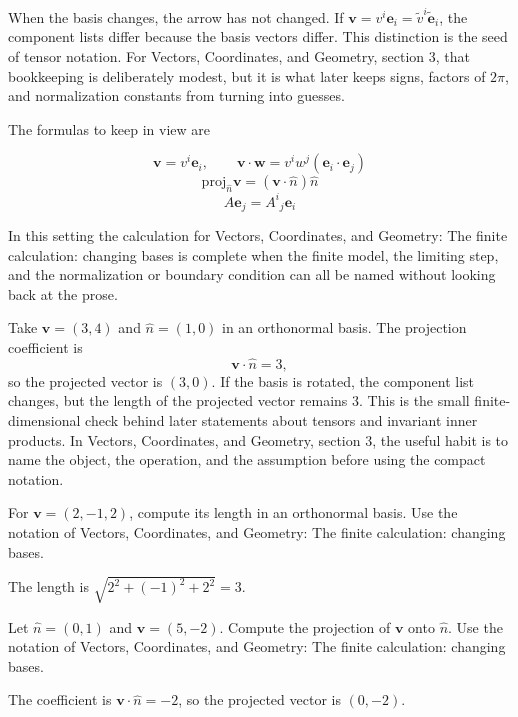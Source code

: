When the basis changes, the arrow has not changed.  If \(\bm v=v^i\bm e_i=\tilde v^i\tilde{\bm e}_i\), the component lists differ because the basis vectors differ.  This distinction is the seed of tensor notation.  For Vectors, Coordinates, and Geometry, section 3, that bookkeeping is deliberately modest, but it is what later keeps signs, factors of \(2\pi\), and normalization constants from turning into guesses.

The formulas to keep in view are

\[
  \bm v=v^i\bm e_i,\qquad \bm v\cdot\bm w=v^iw^j(\bm e_i\cdot\bm e_j)
\]
\[
  \mathrm{proj}_{\hat n}\bm v=(\bm v\cdot\hat n)\hat n
\]
\[
  A\bm e_j=A^i{}_j\bm e_i
\]

In this setting the calculation for Vectors, Coordinates, and Geometry: The finite calculation: changing bases is complete when the finite model, the limiting step, and the normalization or boundary condition can all be named without looking back at the prose.




\begin{example}
Take \(\bm v=(3,4)\) and \(\hat n=(1,0)\) in an orthonormal basis.  The projection coefficient is
\[
  \bm v\cdot\hat n=3,
\]
so the projected vector is \((3,0)\).  If the basis is rotated, the component list changes, but the length of the projected vector remains \(3\).  This is the small finite-dimensional check behind later statements about tensors and invariant inner products.  In Vectors, Coordinates, and Geometry, section 3, the useful habit is to name the object, the operation, and the assumption before using the compact notation.
\end{example}



\begin{exercise}
For \(\bm v=(2,-1,2)\), compute its length in an orthonormal basis.  Use the notation of Vectors, Coordinates, and Geometry: The finite calculation: changing bases.
\begin{answer}
The length is \(\sqrt{2^2+(-1)^2+2^2}=3\).
\end{answer}
\end{exercise}

\begin{exercise}
Let \(\hat n=(0,1)\) and \(\bm v=(5,-2)\).  Compute the projection of \(\bm v\) onto \(\hat n\).  Use the notation of Vectors, Coordinates, and Geometry: The finite calculation: changing bases.
\begin{answer}
The coefficient is \(\bm v\cdot\hat n=-2\), so the projected vector is \((0,-2)\).
\end{answer}
\end{exercise}



